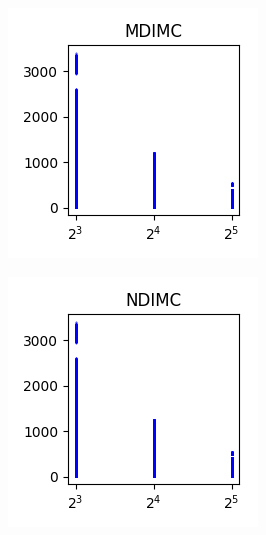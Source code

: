 \documentclass[sigconf,authorversion]{acmart}
\begin{document}
\begin{figure}[hbtp]\ContinuedFloat
    \centering
    \begin{subfigure}[b]{0.3\textwidth}
        \includegraphics[width=\textwidth]{img/MDIMC.png}
        \label{fig:mdimc}
    \end{subfigure}
    \begin{subfigure}[b]{0.3\textwidth}
        \includegraphics[width=\textwidth]{img/NDIMC.png}

\end{subfigure}
\end{figure}
\end{document}
